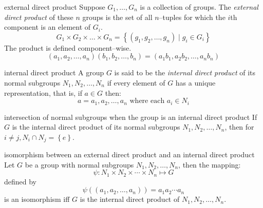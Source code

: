 \documentclass[avery5371,grid]{flashcards}
\begin{document}
\begin{flashcard}[Definition]{external direct product}
Suppose $G_{1},\ldots,G_{n}$ is a collection of groups.  The
\textit{external direct product} of these $n$ groups is the set
of all $n$--tuples for which the $i$th component is an element of
$G_{i}$.
\begin{equation*}
G_{1}\times G_{2}\times \ldots\times G_{n} =
\left\lbrace \left( g_{1},g_{2},\ldots,g_{n}\right)
\mid g_{i} \in G_{i}\right\rbrace 
\end{equation*}
The product is defined component--wise.
\begin{equation*}
\left(a_{1},a_{2},\ldots,a_{n} \right)
\left(b_{1},b_{2},\ldots,b_{n}  \right) =
\left( a_{1}b_{1},a_{2}b_{2},\ldots,a_{n}b_{n} \right) 
\end{equation*}
\end{flashcard}

\begin{flashcard}[Definition]{internal direct product}
A group $G$ is said to be the \textit{internal direct product}
of its normal subgroups $N_{1},N_{2},\ldots,N_{n}$ if every element of
$G$ has a unique representation, that is, if $a \in G$ then:
\begin{equation*}
a = a_{1},a_{2},\ldots,a_{n}  \text{ where each } a_{i} \in N_{i}
\end{equation*}
\end{flashcard}

\begin{flashcard}[Lemma]{intersection of normal subgroups when the group
is an internal direct product}
If $G$ is the internal direct product of its normal subgroups
$N_{1},N_{2},\ldots,N_{n}$, then for $i \neq j, N_{i} \cap N_{j} = 
\left\lbrace e \right\rbrace $.
\end{flashcard}

\begin{flashcard}[Theorem]{isomorphism between an external direct product
and an internal direct product}
Let $G$ be a group with normal subgroups $N_{1},N_{2},\ldots,N_{n}$, then the
mapping:
\begin{equation*}
\psi : N_{1} \times N_{2} \times \cdots \times N_{n} \mapsto G
\end{equation*}
defined by
\begin{equation*}
\psi((a_{1},a_{2},\ldots,a_{n})) = a_{1}a_{2}\cdots a_{n}
\end{equation*}
is an isomorphism iff $G$ is the internal direct product of 
$N_{1},N_{2},\ldots,N_{n}$.
\end{flashcard}
\end{document}
